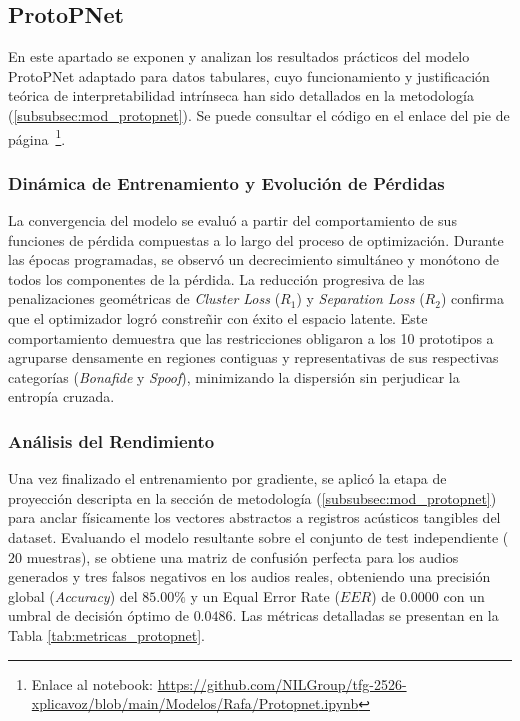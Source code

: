 \subsection{ProtoPNet}
\label{subsec:res_protopnet}

En este apartado se exponen y analizan los resultados prácticos del modelo ProtoPNet adaptado para datos tabulares, cuyo funcionamiento y justificación teórica de interpretabilidad intrínseca han sido detallados en la metodología (\autoref{subsubsec:mod_protopnet}). Se puede consultar el código en el enlace del pie de página~\footnote{Enlace al notebook: \url{https://github.com/NILGroup/tfg-2526-xplicavoz/blob/main/Modelos/Rafa/Protopnet.ipynb}}.

\subsubsection*{Dinámica de Entrenamiento y Evolución de Pérdidas}

La convergencia del modelo se evaluó a partir del comportamiento de sus funciones de pérdida compuestas a lo largo del proceso de optimización. Durante las épocas programadas, se observó un decrecimiento simultáneo y monótono de todos los componentes de la pérdida. La reducción progresiva de las penalizaciones geométricas de \textit{Cluster Loss} ($R_1$) y \textit{Separation Loss} ($R_2$) confirma que el optimizador logró constreñir con éxito el espacio latente. Este comportamiento demuestra que las restricciones obligaron a los 10 prototipos a agruparse densamente en regiones contiguas y representativas de sus respectivas categorías (\textit{Bonafide} y \textit{Spoof}), minimizando la dispersión sin perjudicar la entropía cruzada.

\subsubsection*{Análisis del Rendimiento}

Una vez finalizado el entrenamiento por gradiente, se aplicó la etapa de proyección descripta en la sección de metodología (\autoref{subsubsec:mod_protopnet}) para anclar físicamente los vectores abstractos a registros acústicos tangibles del dataset. Evaluando el modelo resultante sobre el conjunto de test independiente ($20$ muestras), se obtiene una matriz de confusión perfecta para los audios generados y tres falsos negativos en los audios reales, obteniendo una precisión global (\textit{Accuracy}) del $85.00\%$ y un Equal Error Rate ($EER$) de $0.0000$ con un umbral de decisión óptimo de $0.0486$. Las métricas detalladas se presentan en la Tabla \ref{tab:metricas_protopnet}.

